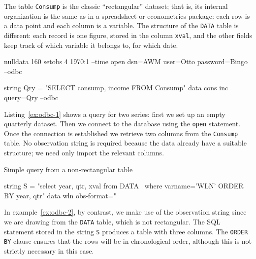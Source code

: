 The table \texttt{Consump} is the classic ``rectangular'' dataset;
that is, its internal organization is the same as in a spreadsheet or
econometrics package: each row is a data point and each column is a
variable. The structure of the \texttt{DATA} table
is different: each record is one figure, stored in the column
\texttt{xval}, and the other fields keep track of which variable it
belongs to, for which date.

\begin{script}[htbp]
  \label{ex:odbc-1}
\begin{scode}
nulldata 160
setobs 4 1970:1 --time
open dsn=AWM user=Otto password=Bingo --odbc

string Qry = "SELECT consump, income FROM Consump"
data cons inc query=Qry --odbc
\end{scode}
\end{script}

Listing~\ref{ex:odbc-1} shows a query for two series: first we set up
an empty quarterly dataset. Then we connect to the database using the
\texttt{open} statement. Once the connection is established we
retrieve two columns from the \texttt{Consump} table. No observation
string is required because the data already have a suitable structure;
we need only import the relevant columns.

\begin{script}[htbp]
  \caption{Simple query from a non-rectangular table}
  \label{ex:odbc-2}
\begin{scode}
string S = "select year, qtr, xval from DATA \
       where varname='WLN' ORDER BY year, qtr"
data wln obs-format="%
\end{scode}
\end{script}

In example~\ref{ex:odbc-2}, by contrast, we make use of the
observation string since we are drawing from the \texttt{DATA}
table, which is not rectangular. The SQL statement stored in the
string \texttt{S} produces a table with three columns. The
\texttt{ORDER BY} clause ensures that the rows will be in
chronological order, although this is not strictly necessary in this
case.

